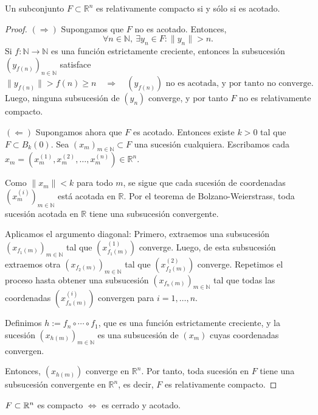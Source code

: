 \begin{prop}
  Un subconjunto \(F \subset \mathbb{R}^n\) es relativamente compacto si y sólo si es acotado.
  \begin{proof}
    \((\Rightarrow)\) Supongamos que \(F\) no es acotado. Entonces,
    \[
      \forall n \in \mathbb{N},\ \exists y_n \in F : \|y_n\| > n.
    \]
    Si \(f : \mathbb{N} \to \mathbb{N} \) es una función estrictamente creciente, entonces la subsucesión \({(y_{f(n)})}_{n \in \mathbb{N}} \) satisface
    \[
      \|y_{f(n)}\| > f(n) \geq n \quad \Rightarrow \quad (y_{f(n)}) \text{ no es acotada, y por tanto no converge}.
    \]
    Luego, ninguna subsucesión de \((y_n)\) converge, y por tanto \(F\) no es relativamente compacto.

    \medskip

    \((\Leftarrow)\) Supongamos ahora que \(F\) es acotado. Entonces existe \(k > 0\) tal que \(F \subset B_k(0)\).
    Sea \({(x_m)}_{m \in \mathbb{N}} \subset F\) una sucesión cualquiera.
    Escribamos cada \(x_m = (x_{m}^{(1)}, x_{m}^{(2)}, \dots, x_{m}^{(n)}) \in \mathbb{R}^n\).

    Como \( \|x_m\| < k\) para todo \(m\), se sigue que cada sucesión de coordenadas \({(x_m^{(i)})}_{m \in \mathbb{N}} \) está acotada en \(\mathbb{R} \).
    Por el teorema de Bolzano-Weierstrass, toda sucesión acotada en \(\mathbb{R} \) tiene una subsucesión convergente.

    Aplicamos el argumento diagonal:
    Primero, extraemos una subsucesión \({(x_{f_1(m)})}_{m \in \mathbb{N}} \) tal que \((x_{f_1(m)}^{(1)})\) converge.
    Luego, de esta subsucesión extraemos otra \({(x_{f_2(m)})}_{m \in \mathbb{N}} \) tal que \((x_{f_2(m)}^{(2)})\) converge.
    Repetimos el proceso hasta obtener una subsucesión \({(x_{f_n(m)})}_{m \in \mathbb{N}} \) tal que todas las coordenadas \((x_{f_n(m)}^{(i)})\) convergen para \(i = 1, \dots, n\).

    Definimos \(h := f_n \circ \cdots \circ f_1\), que es una función estrictamente creciente, y la sucesión \({(x_{h(m)})}_{m \in \mathbb{N}} \) es una subsucesión de \((x_m)\) cuyas coordenadas convergen.

    Entonces, \((x_{h(m)})\) converge en \(\mathbb{R}^n\).
    Por tanto, toda sucesión en \(F\) tiene una subsucesión convergente en \(\mathbb{R}^n\), es decir, \(F\) es relativamente compacto.
  \end{proof}
\end{prop}

\begin{corollary}
  \(F \subset \mathbb{R}^n\) es compacto \(\iff \) es cerrado y acotado.
\end{corollary}

